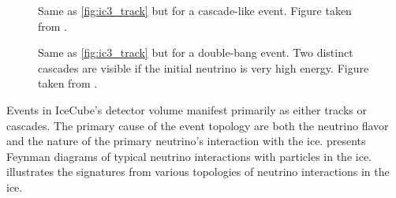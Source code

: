\begin{figure}
    \caption{Same as \cref{fig:ic3_track} but for a cascade-like event. Figure taken from \cite{IC3_masterclass}.}
    \label{fig:ic3_cascade}
\end{figure}

\begin{figure}
    \caption{Same as \cref{fig:ic3_track} but for a double-bang event. Two distinct cascades are visible if the initial neutrino is very high energy. Figure taken from \cite{IC3_masterclass}.}
    \label{fig:ic3_doubleBang}
\end{figure}

Events in IceCube's detector volume manifest primarily as either tracks or cascades.
The primary cause of the event topology are both the neutrino flavor and the nature of the primary neutrino's interaction with the ice.
 presents Feynman diagrams of typical neutrino interactions with particles in the ice.
 illustrates the signatures from various topologies of neutrino interactions in the ice.

